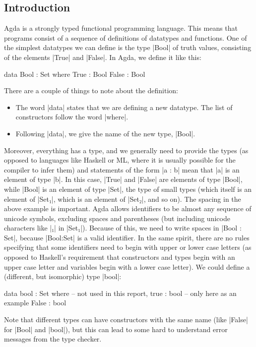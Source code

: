 \subsection{Introduction}
Agda is a strongly typed functional programming language. This means that programs consist of a sequence of definitions of datatypes and functions. One of the simplest datatypes we can define is the type |Bool| of truth values, consisting of the elements |True| and |False|. In Agda, we define it like this:
\begin{code}
data Bool : Set where
  True   : Bool
  False  : Bool
\end{code}
There are a couple of things to note about the definition:
\begin{itemize}
\item The word |data| states that we are defining a new datatype. The list of constructors follow the word |where|. 
\item Following |data|, we give the name of the new type, |Bool|.
\end{itemize}
Moreover, everything has a type, and we generally need to provide the types (as opposed to languages like Haskell or ML, where it is usually possible for the compiler to infer them) and statements of the form |a : b| mean that |a| is an element of type |b|. In this case, |True| and |False| are elements of type |Bool|, while |Bool| is an element of type |Set|, the type of small types (which itself is an element of |Set₁|, which is an element of |Set₂|, and so on).
The spacing in the above example is important. Agda allows identifiers to be almost any sequence of unicode symbols, excluding spaces and parentheses (but including unicode characters like |₁| in |Set₁|). Because of this, we need to write spaces in |Bool : Set|, because |Bool:Set| is a valid identifier. In the same spirit, there are no rules specifying that some identifiers need to begin with upper or lower case letters (as opposed to Haskell's requirement that constructors and types begin with an upper case letter and variables begin with a lower case letter). We could define a (different, but isomorphic) type |bool|:
\begin{code}
data bool : Set where  -- not used in this report,
  true  : bool         -- only here as an example
  False : bool
\end{code}
Note that different types can have constructors with the same name (like |False| for |Bool| and |bool|), but this can lead to some hard to understand error messages from the type checker.

